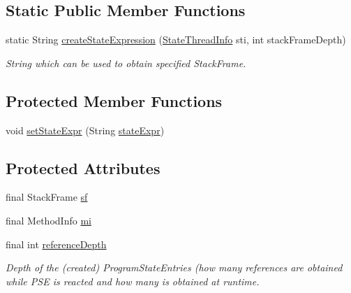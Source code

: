 \subsection*{Static Public Member Functions}
\begin{DoxyCompactItemize}
\item 
static String \hyperlink{classgov_1_1nasa_1_1jpf_1_1inspector_1_1server_1_1programstate_1_1_state_stack_frame_a5c559249ce3d5e9f381188bdfa3c676d}{create\+State\+Expression} (\hyperlink{classgov_1_1nasa_1_1jpf_1_1inspector_1_1server_1_1programstate_1_1_state_thread_info}{State\+Thread\+Info} sti, int stack\+Frame\+Depth)
\begin{DoxyCompactList}\small\item\em String which can be used to obtain specified Stack\+Frame. \end{DoxyCompactList}\end{DoxyCompactItemize}
\subsection*{Protected Member Functions}
\begin{DoxyCompactItemize}
\item 
void \hyperlink{classgov_1_1nasa_1_1jpf_1_1inspector_1_1server_1_1programstate_1_1_state_node_a7ed75cc4ba543123c95e506db6f7b84c}{set\+State\+Expr} (String \hyperlink{classgov_1_1nasa_1_1jpf_1_1inspector_1_1server_1_1programstate_1_1_state_node_a784a38d8edeb54f871891cb63de85585}{state\+Expr})
\end{DoxyCompactItemize}
\subsection*{Protected Attributes}
\begin{DoxyCompactItemize}
\item 
final Stack\+Frame \hyperlink{classgov_1_1nasa_1_1jpf_1_1inspector_1_1server_1_1programstate_1_1_state_stack_frame_a99c4d184fc27fa72ef791c58822af3f7}{sf}
\item 
final Method\+Info \hyperlink{classgov_1_1nasa_1_1jpf_1_1inspector_1_1server_1_1programstate_1_1_state_stack_frame_aed952eab2d35bc628c9e8ba31630e3d5}{mi}
\item 
final int \hyperlink{classgov_1_1nasa_1_1jpf_1_1inspector_1_1server_1_1programstate_1_1_state_node_a55683618625dae46e8aa68d95811d6bb}{reference\+Depth}
\begin{DoxyCompactList}\small\item\em Depth of the (created) Program\+State\+Entries (how many references are obtained while P\+SE is reacted and how many is obtained at runtime. \end{DoxyCompactList}\end{DoxyCompactItemize}



